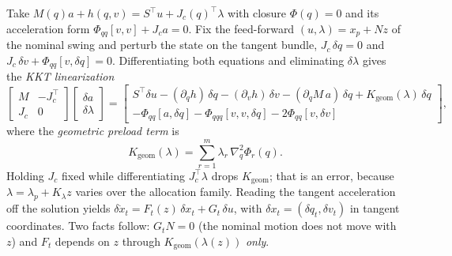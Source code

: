 \documentclass[11pt,a4paper]{article}
\begin{document}
Take $M(q)a+h(q,v)=S^{\!\top}u+J_c(q)^{\!\top}\lambda$ with closure
$\Phi(q)=0$ and its acceleration form $\Phi_{qq}[v,v]+J_c a=0$.  Fix the
feed-forward $(u,\lambda)=x_p+Nz$ of the nominal swing and perturb the state on
the tangent bundle, $J_c\,\delta q=0$ and $J_c\,\delta v+\Phi_{qq}[v,\delta q]=0$.
Differentiating both equations and eliminating $\delta\lambda$ gives the
\emph{KKT linearization}
\begin{equation}
\begin{bmatrix} M & -J_c^{\!\top}\\ J_c & 0\end{bmatrix}
\begin{bmatrix}\delta a\\ \delta\lambda\end{bmatrix}
=\begin{bmatrix}
S^{\!\top}\delta u-(\partial_q h)\,\delta q-(\partial_v h)\,\delta v
-(\partial_q M\,a)\,\delta q+K_{\mathrm{geom}}(\lambda)\,\delta q\\[2pt]
-\Phi_{qq}[a,\delta q]-\Phi_{qqq}[v,v,\delta q]-2\Phi_{qq}[v,\delta v]
\end{bmatrix},
\label{eq:var-kkt}
\end{equation}
where the \emph{geometric preload term} is
\begin{equation}
K_{\mathrm{geom}}(\lambda)=\sum_{r=1}^{m}\lambda_r\,\nabla_q^2\Phi_r(q).
\label{eq:var-kgeom}
\end{equation}
Holding $J_c$ fixed while differentiating $J_c^{\!\top}\lambda$ drops
$K_{\mathrm{geom}}$; that is an error, because $\lambda=\lambda_p+K_\lambda z$
varies over the allocation family.  Reading the tangent acceleration off the
solution yields $\delta\dot x_t=F_t(z)\,\delta x_t+G_t\,\delta u$, with
$\delta x_t=(\delta q_t,\delta v_t)$ in tangent coordinates.  Two facts follow:
$G_t N=0$ (the nominal motion does not move with $z$) and $F_t$ depends on $z$
through $K_{\mathrm{geom}}(\lambda(z))$ \emph{only}.
\end{document}
